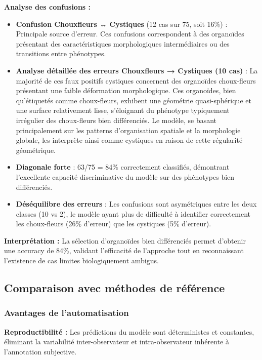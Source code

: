 \textbf{Analyse des confusions :}
\begin{itemize}
    \item \textbf{Confusion Chouxfleurs ↔ Cystiques} (12 cas sur 75, soit 16\%) : Principale source d'erreur. Ces confusions correspondent à des organoïdes présentant des caractéristiques morphologiques intermédiaires ou des transitions entre phénotypes.
    
    \item \textbf{Analyse détaillée des erreurs Chouxfleurs → Cystiques (10 cas)} : La majorité de ces faux positifs cystiques concernent des organoïdes choux-fleurs présentant une faible déformation morphologique. Ces organoïdes, bien qu'étiquetés comme choux-fleurs, exhibent une géométrie quasi-sphérique et une surface relativement lisse, s'éloignant du phénotype typiquement irrégulier des choux-fleurs bien différenciés. Le modèle, se basant principalement sur les patterns d'organisation spatiale et la morphologie globale, les interprète ainsi comme cystiques en raison de cette régularité géométrique.
    
    \item \textbf{Diagonale forte} : 63/75 = 84\% correctement classifiés, démontrant l'excellente capacité discriminative du modèle sur des phénotypes bien différenciés.
    
    \item \textbf{Déséquilibre des erreurs} : Les confusions sont asymétriques entre les deux classes (10 vs 2), le modèle ayant plus de difficulté à identifier correctement les choux-fleurs (26\% d'erreur) que les cystiques (5\% d'erreur).
\end{itemize}

\textbf{Interprétation :}
La sélection d'organoïdes bien différenciés permet d'obtenir une accuracy de 84\%, validant l'efficacité de l'approche tout en reconnaissant l'existence de cas limites biologiquement ambigus.

\subsection{Comparaison avec méthodes de référence}

\subsubsection{Avantages de l'automatisation}

\textbf{Reproductibilité :}
Les prédictions du modèle sont déterministes et constantes, éliminant la variabilité inter-observateur et intra-observateur inhérente à l'annotation subjective.

